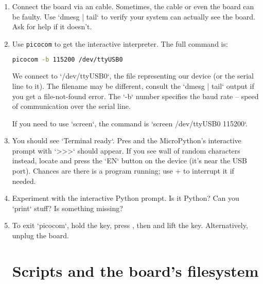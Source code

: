 \documentclass{../tutorial}
\begin{document}
\begin{enumerate}
    \begin{comment}
        To protect delicate pins and make connections easier,
        the black \abbr{ESP32} devkit is plugged into a white OctopusLab Robot~Board, possibly with some extra chips.
        Please ask if you want to unplug it.
    \end{comment}

\item
    Connect the  board via an  cable.
    Sometimes, the cable or even the board can be faulty.
    Use `dmesg | tail` to verify your system can actually see the board.
    Ask for help if it doesn't.

\item
    Use \texttt{picocom} to get the interactive interpreter.
    The full command is:

    \begin{lstlisting}[language=bash]
    picocom -b 115200 /dev/ttyUSB0
    \end{lstlisting}

    We connect to `/dev/ttyUSB0`, the file representing our device (or the
    serial line to it).
    The filename may be different, consult the `dmesg | tail` output if you get
    a file-not-found error.
    The `-b` number specifies the baud rate -- speed of communication over the
    serial line.

    If you need to use `screen`,
    the command is `screen /dev/ttyUSB0 115200`.

\item
    You should see `Terminal ready`.
    Pres  and the MicroPython's interactive prompt with `>>>` should appear.
    If you see wall of random characters instead,
    locate and press the `EN` button on the device
    (it's near the USB port).
    Chances are there is a program running;
    use + to interrupt it if needed.

\item
    Experiment with the interactive Python prompt. Is it Python?
    Can you `print` stuff? Is something missing?

\item
    To exit `picocom`, hold the  key, press ,
    then  and lift the  key.
    Alternatively, unplug the board.

\section{Scripts and the board's filesystem}


\end{enumerate}
\end{document}
